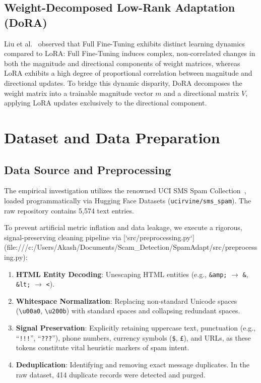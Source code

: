 \documentclass[conference]{IEEEtran}
\begin{document}
\subsection{Weight-Decomposed Low-Rank Adaptation (DoRA)}
Liu et al.~\cite{liu2024dora} observed that Full Fine-Tuning exhibits distinct learning dynamics compared to LoRA: Full Fine-Tuning induces complex, non-correlated changes in both the magnitude and directional components of weight matrices, whereas LoRA exhibits a high degree of proportional correlation between magnitude and directional updates. To bridge this dynamic disparity, DoRA decomposes the weight matrix into a trainable magnitude vector $m$ and a directional matrix $V$, applying LoRA updates exclusively to the directional component.

\section{Dataset and Data Preparation}
\label{sec:dataset}

\subsection{Data Source and Preprocessing}
The empirical investigation utilizes the renowned UCI SMS Spam Collection~\cite{almeida2011sms}, loaded programmatically via Hugging Face Datasets (\texttt{ucirvine/sms\_spam}). The raw repository contains 5,574 text entries.

To prevent artificial metric inflation and data leakage, we execute a rigorous, signal-preserving cleaning pipeline via [`src/preprocessing.py`](file:///c:/Users/Akash/Documents/Scam_Detection/SpamAdapt/src/preprocessing.py):
\begin{enumerate}
    \item \textbf{HTML Entity Decoding}: Unescaping HTML entities (e.g., \texttt{\&amp;} $\rightarrow$ \texttt{\&}, \texttt{\&lt;} $\rightarrow$ \texttt{<}).
    \item \textbf{Whitespace Normalization}: Replacing non-standard Unicode spaces (\texttt{\textbackslash u00a0}, \texttt{\textbackslash u200b}) with standard spaces and collapsing redundant spaces.
    \item \textbf{Signal Preservation}: Explicitly retaining uppercase text, punctuation (e.g., ``\texttt{!!!}'', ``\texttt{???}''), phone numbers, currency symbols (\texttt{\$}, \texttt{\pounds}), and URLs, as these tokens constitute vital heuristic markers of spam intent.
    \item \textbf{Deduplication}: Identifying and removing exact message duplicates. In the raw dataset, 414 duplicate records were detected and purged.
\end{enumerate}
\end{document}
